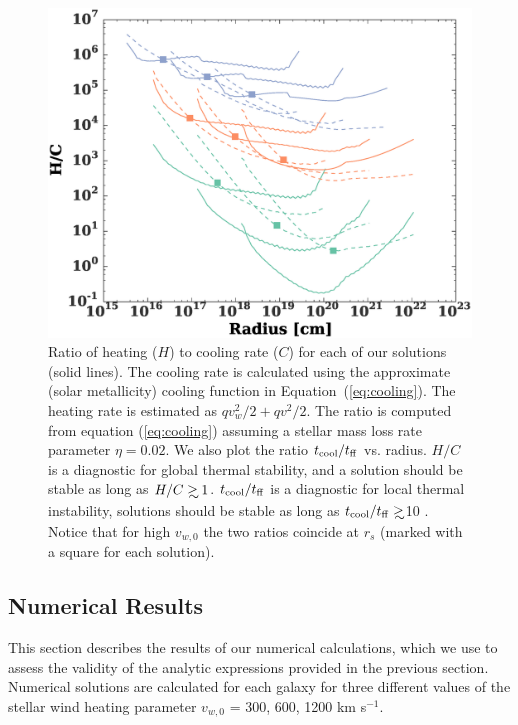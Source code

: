\documentclass[usenatbib,fleqn]{mn2e}
\newcommand\gsim{\mathrel{\rlap{\lower4pt\hbox{\hskip1pt$\sim$}}
    \raise1pt\hbox{$>$}}}
\newcommand{\rs}{r_s}
\newcommand{\vw}{v_w}
\newcommand{\vwO}{v_{w,0}}
\newcommand{\tcool}{t_{\rm cool}}
\newcommand{\tff}{t_{\rm ff}}
\begin{document}
\begin{figure}
  \includegraphics[width=\columnwidth]{cooling.eps}
  \caption{\label{fig:cooling} Ratio of heating ($H$) to cooling rate
    ($C$) for each of our solutions (solid lines). The cooling rate is
    calculated using the approximate (solar metallicity) cooling
    function in Equation~(\ref{eq:cooling}). The heating rate is
    estimated as $q \vw^2/2+q v^2/2$. The ratio is computed from
    equation (\ref{eq:cooling}) assuming a stellar mass loss rate
    parameter $\eta=0.02$. We also plot the ratio $\tcool/\tff$
    vs. radius. $H/C$ is a diagnostic for global thermal stability,
    and a solution should be stable as long as
    $H/C\gsim1$. $\tcool/\tff$ is a diagnostic for local thermal
    instability, solutions should be stable as long as $\tcool/t_{\rm
      ff}\gsim$10 \citealt{McCourt+12}. Notice that for high $\vwO$
    the two ratios coincide at $\rs$ (marked with a square for each
    solution).}
\end{figure}


%


\subsection{Numerical Results}
\label{sec:numerical}

This section describes the results of our numerical calculations, which we use to assess the validity of the analytic expressions provided in the previous section.  Numerical solutions are calculated for each galaxy for three different values of the stellar wind heating parameter $v_{w,0}$ = 300, 600, 1200 km s$^{-1}$.  
\end{document}
